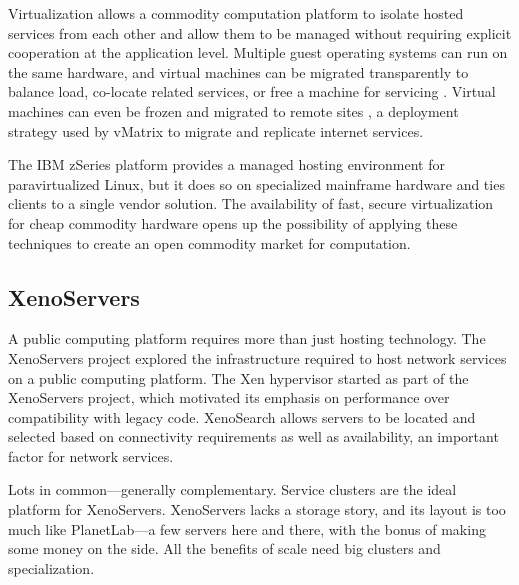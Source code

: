 
Virtualization allows a commodity computation platform to isolate hosted services from each other and allow them to be managed without requiring explicit cooperation at the application level. Multiple guest operating systems can run on the same hardware, and virtual machines can be migrated transparently to balance load, co-locate related services, or free a machine for servicing \cite{clark}. Virtual machines can even be frozen and migrated to remote sites \cite{sapuntzakis02}, a deployment strategy used by vMatrix \cite{awadallah} to migrate and replicate internet services.

The IBM zSeries \cite{ibmzseries} platform provides a managed hosting environment for paravirtualized Linux, but it does so on specialized mainframe hardware and ties clients to a single vendor solution. The availability of fast, secure virtualization for cheap commodity hardware opens up the possibility of applying these techniques to create an open commodity market for computation.

\subsection{XenoServers}

A public computing platform requires more than just hosting technology. The XenoServers project \cite{reed,kotsovinos04a} explored the infrastructure required to host network services on a public computing platform. The Xen hypervisor started as part of the XenoServers project, which motivated its emphasis on performance over compatibility with legacy code. XenoSearch \cite{spence} allows servers to be located and selected based on connectivity requirements as well as availability, an important factor for network services.

Lots in common---generally complementary. Service clusters are the ideal platform for XenoServers. XenoServers lacks a storage story, and its layout is too much like PlanetLab---a few servers here and there, with the bonus of making some money on the side. All the benefits of scale need big clusters and specialization.

